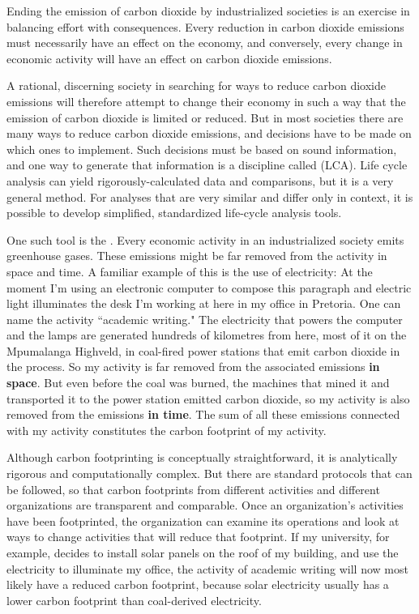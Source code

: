 Ending the emission of carbon dioxide by industrialized societies is an exercise
in balancing effort with consequences. Every reduction in carbon dioxide
emissions must necessarily have an effect on the economy, and conversely, every
change in economic activity will have an effect on carbon dioxide emissions.

A rational, discerning society in searching for ways to reduce carbon dioxide
emissions will therefore attempt to change their economy in such a way that the
emission of carbon dioxide is limited or reduced. But in most societies there
are many ways to reduce carbon dioxide emissions, and decisions have to be made
on which ones to implement. Such decisions must be based on sound information,
and one way to generate that information is a discipline called  (LCA). Life cycle analysis can yield rigorously-calculated data
and comparisons, but it is a very general method. For analyses that are very
similar and differ only in context, it is possible to develop simplified,
standardized life-cycle analysis tools.

One such tool is the . Every economic activity in an
industrialized society emits greenhouse gases. These emissions might  be far
removed from the activity in space and time. A familiar example of this is the
use of electricity: At the moment I'm using an electronic computer to compose
this paragraph and electric light illuminates the desk I'm working at here in my
office in Pretoria. One can name the activity ``academic writing." The
electricity that powers the computer and the lamps are generated hundreds of
kilometres from here, most of it on the Mpumalanga Highveld, in coal-fired power
stations that emit carbon dioxide in the process. So my activity is far removed
from the associated emissions \textbf{in space}. But even before the coal was
burned, the machines that mined it and transported it to the power station
emitted carbon dioxide, so my activity is also removed from the emissions
\textbf{in time}. The sum of all these emissions connected with my activity
constitutes the carbon footprint of my activity.

Although carbon footprinting is conceptually straightforward, it is analytically
rigorous and computationally complex. But there are standard protocols
\autocite{WRI2004} that can be followed, so that carbon footprints from
different activities and different organizations are transparent and comparable.
Once an organization's activities have been footprinted, the organization can
examine its operations and look at ways to change activities that will reduce
that footprint. If my university, for example, decides to install solar panels
on the roof of my building, and use the electricity to illuminate my office, the
activity of academic writing will now most likely have a reduced carbon
footprint, because solar electricity usually has a lower carbon footprint than
coal-derived electricity.

